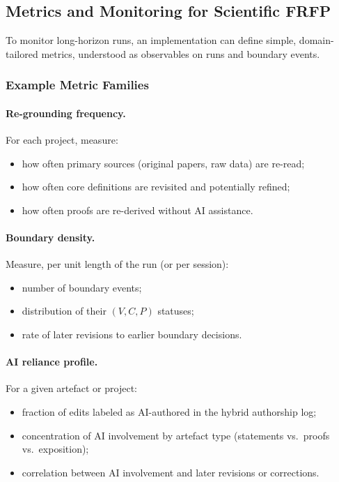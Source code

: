 \subsection{Metrics and Monitoring for Scientific FRFP}

To monitor long-horizon runs, an implementation can define simple, domain-tailored
metrics, understood as observables on runs and boundary events.

\subsubsection*{Example Metric Families}

\paragraph{Re-grounding frequency.}
For each project, measure:

\begin{itemize}
  \item how often primary sources (original papers, raw data) are re-read;
  \item how often core definitions are revisited and potentially refined;
  \item how often proofs are re-derived without AI assistance.
\end{itemize}

\paragraph{Boundary density.}
Measure, per unit length of the run (or per session):

\begin{itemize}
  \item number of boundary events;
  \item distribution of their $(V, C, P)$ statuses;
  \item rate of later revisions to earlier boundary decisions.
\end{itemize}

\paragraph{AI reliance profile.}
For a given artefact or project:

\begin{itemize}
  \item fraction of edits labeled as AI-authored in the hybrid authorship log;
  \item concentration of AI involvement by artefact type
        (statements vs.\ proofs vs.\ exposition);
  \item correlation between AI involvement and later revisions or corrections.
\end{itemize}

